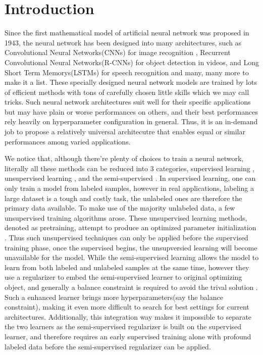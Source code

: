 \documentclass[3p,times,procedia]{elsarticle}
\begin{document}

\section{Introduction}
\label{main}
Since the first mathematical model 
of artificial neural network was 
proposed in 1943\cite{mcculloch1943logical}, 
the neural network has been 
designed into many architectures, 
such as Convolutional Neural 
Networks(CNNs) for image 
recognition
\cite{krizhevsky2012imagenet}, 
Recurrent Convolutional Neural 
Networks(R-CNNs) for object 
detection in 
videos\cite{girshick2015fast}, 
and Long Short Term Memorys(LSTMs)
for speech recognition
\cite{graves2013hybrid} and many, 
many more to make it a list. 
These specially designed neural 
network models are trained by 
lots of efficient methods with 
tons of carefully chosen little 
skills which we may call tricks. 
Such neural network architectures
suit well for their specific 
applications but may have plain 
or worse performances on others, 
and their best performances 
rely heavily on hyperparameter 
configuration in general. Thus, 
it is an in-demand job to propose 
a relatively universal 
architecutre that enables equal 
or similar performances among 
varied applications.

We notice that, although there're 
plenty of choices to train a 
neural network, literally all 
these methods can be reduced into
3 categories, supervised learning
\cite{lecun1990handwritten}, 
unsupervised learning
\cite{vincent2010stacked}, 
and the semi-supervised
\cite{chapelle2009semi}.
In supervised learning, 
one can only train a model from 
labeled samples, however in real 
applications, labeling a large 
dataset is a tough and costly 
task, the unlabeled ones are 
therefore the primary data 
available. To make use of the 
majority unlabeled data, a few 
unsupervised training algorithms 
arose. These unsupervised learning
methods, denoted as pretraining, 
attempt to produce an optimized 
parameter initialization
\cite{le2013building}.
Thus such unsupervised techniques 
can only be applied before the 
supervised training phase, once 
the supervised begins, the 
unsupversied learning will become 
unavailable for the model.
While the semi-supervised learning
allows the model to learn from
both labeled and unlabeled samples 
at the same time, however they use a
regularizer to embed the semi-supervised
learner to original optimizing object,
and generally a balance constraint is
required to avoid the trival solution
\cite{socher2011semi}.
Such a enhanced learner brings more 
hyperparameters(say the balance 
constraint), making it even more 
difficult to search for best settings
for current architectures. 
Additionally, this integration way 
makes it impossible to separate the 
two learners as the semi-supervised 
regularizer is built on the supervised 
learner, and therefore requires an 
early supervised training alone with 
profound labeled data before the 
semi-supervised regularizer can be
applied.
\end{document}
